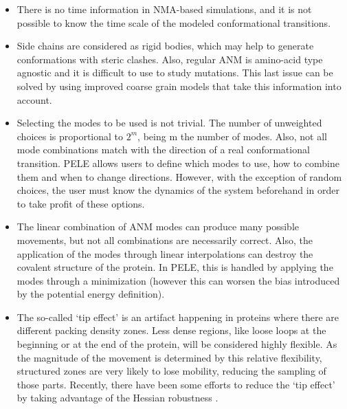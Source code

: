 \begin{itemize}
\item  There is no time information in NMA-based simulations, and it is not possible to know the time scale of the modeled conformational transitions.
\item  Side chains are considered as rigid bodies, which may help to generate conformations with steric clashes. Also, regular ANM is  amino-acid type agnostic and it is difficult to use to study mutations. This last issue can be solved by using improved coarse grain models \cite{frappier_coarse-grained_2014} that take this information into account. 
\item  Selecting the modes to be used is not trivial. The number of unweighted choices is proportional to $2^m$, being m the number of modes. Also, not all mode combinations match with the direction of a real conformational transition. PELE allows users to define which modes to use, how to combine them and when to change directions. However, with the exception of random choices, the user must know the dynamics of the system beforehand in order to take profit of these options.
\item  The linear combination of ANM modes can produce many possible movements, but not all combinations are necessarily correct. Also, the application of the modes through linear interpolations can destroy the covalent structure of the protein. In PELE, this is handled by applying the modes through a minimization (however this can worsen the bias introduced by the potential energy definition).
\item  The so-called `tip effect' is an artifact happening in proteins where there are different packing density zones. Less dense regions, like loose loops at the beginning or at the end of the protein, will be considered highly flexible. As the magnitude of the movement is determined by this relative flexibility, structured zones are very likely to lose mobility, reducing the sampling of those parts. Recently, there have been some efforts to reduce the `tip effect' by taking advantage of the Hessian robustness \cite{lu_new_2006}.

\end{itemize}




